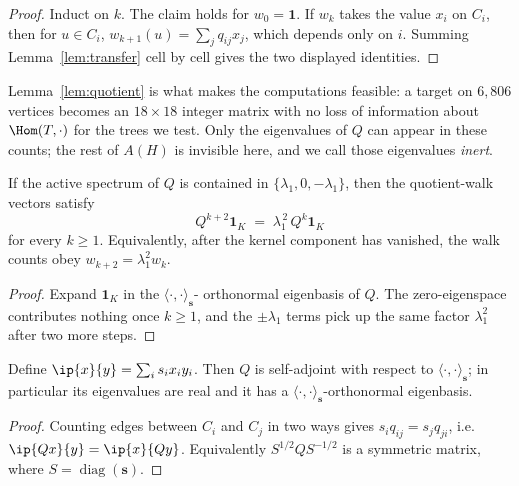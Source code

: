 \begin{proof}
  Induct on $k$. The claim holds for $w_0 = \mathbf{1}$. If $w_{k}$ takes
  the value $x_i$ on $C_i$, then for $u \in C_i$,
  $w_{k+1}(u) = \sum_j q_{ij} x_j$, which depends only on $i$. Summing
  Lemma~\ref{lem:transfer} cell by cell gives the two displayed
  identities.
\end{proof}

Lemma~\ref{lem:quotient} is what makes the computations feasible: a
target on $6{,}806$ vertices becomes an $18 \times 18$ integer matrix
with no loss of information about $\Hom(T,\cdot)$ for the trees we test.
Only the eigenvalues of $Q$ can appear in these counts; the rest of
$A(H)$ is invisible here, and we call those eigenvalues \emph{inert}.

\begin{lemma}
  \label{lem:active_recurrence}
  If the active spectrum of $Q$ is contained in
  $\{\lambda_1, 0, -\lambda_1\}$, then the quotient-walk vectors satisfy
  \[
    Q^{k+2}\mathbf{1}_K \;=\; \lambda_1^{\,2}\, Q^k\mathbf{1}_K
  \]
  for every $k \ge 1$. Equivalently, after the kernel component has
  vanished, the walk counts obey $w_{k+2} = \lambda_1^2 w_k$.
\end{lemma}

\begin{proof}
  Expand $\mathbf{1}_K$ in the $\langle\cdot,\cdot\rangle_{\mathbf{s}}$-
  orthonormal eigenbasis of $Q$. The zero-eigenspace contributes nothing
  once $k \ge 1$, and the $\pm \lambda_1$ terms pick up the same factor
  $\lambda_1^2$ after two more steps.
\end{proof}

\begin{lemma}
  \label{lem:selfadjoint}
  Define $\ip{x}{y} = \sum_i s_i x_i y_i$. Then $Q$ is self-adjoint with
  respect to $\langle\cdot,\cdot\rangle_{\mathbf{s}}$; in particular its
  eigenvalues are real and it has a $\langle\cdot,\cdot\rangle_{\mathbf{s}}$-orthonormal
  eigenbasis.
\end{lemma}

\begin{proof}
  Counting edges between $C_i$ and $C_j$ in two ways gives
  $s_i q_{ij} = s_j q_{ji}$, i.e.\ $\ip{Qx}{y} = \ip{x}{Qy}$.
  Equivalently $S^{1/2} Q S^{-1/2}$ is a symmetric matrix, where
  $S = \operatorname{diag}(\mathbf{s})$.
\end{proof}

